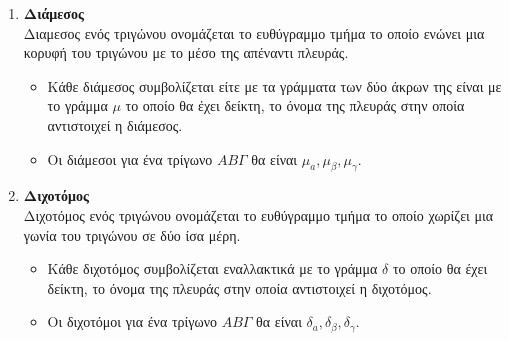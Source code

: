 \documentclass[twoside,10pt]{book}
\begin{document}
\begin{enumerate}[label=\bf\arabic*.]
\item \textbf{Διάμεσος}\\
Διαμεσος ενός τριγώνου ονομάζεται το ευθύγραμμο τμήμα το οποίο ενώνει μια κορυφή του τριγώνου με το μέσο της απέναντι πλευράς. \begin{itemize}
\item Κάθε διάμεσος συμβολίζεται είτε με τα γράμματα των δύο άκρων της είναι με το γράμμα $ \mu $ το οποίο θα έχει δείκτη, το όνομα της πλευράς στην οποία αντιστοιχεί η διάμεσος. 
\item Οι διάμεσοι για ένα τρίγωνο $ AB\varGamma $ θα είναι $ \mu_a,\mu_\beta,\mu_\gamma $.
\end{itemize}
\item \textbf{Διχοτόμος}\\
Διχοτόμος ενός τριγώνου ονομάζεται το ευθύγραμμο τμήμα το οποίο χωρίζει μια γωνία του τριγώνου σε δύο ίσα μέρη.
\begin{itemize}
\item Κάθε διχοτόμος συμβολίζεται εναλλακτικά με το γράμμα $ \delta $ το οποίο θα έχει δείκτη, το όνομα της πλευράς στην οποία αντιστοιχεί η διχοτόμος. 
\item Οι διχοτόμοι για ένα τρίγωνο $ AB\varGamma $ θα είναι $ \delta_a,\delta_\beta,\delta_\gamma $.
\end{itemize}
\end{enumerate}
\end{document}
